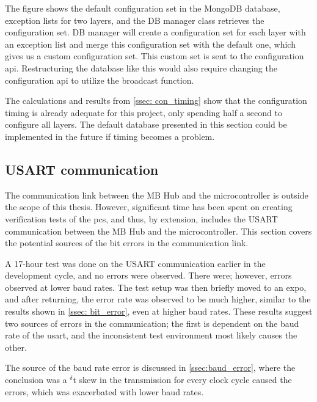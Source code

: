 \documentclass[main.tex]{subfiles}
\begin{document}
The figure shows the default configuration set in the MongoDB database, exception lists for two layers, and the DB manager class retrieves the configuration set. DB manager will create a configuration set for each layer with an exception list and merge this configuration set with the default one, which gives us a custom configuration set. This custom set is sent to the configuration \gls{api}. Restructuring the database like this would also require changing the configuration \gls{api} to utilize the broadcast function.

The calculations and results from \autoref{ssec: con_timing} show that the configuration timing is already adequate for this project, only spending half a second to configure all layers. The default database presented in this section could be implemented in the future if timing becomes a problem.


 
 
\subsection{USART communication}

The communication link between the MB Hub and the microcontroller is outside the scope of this thesis. However, significant time has been spent on creating verification tests of the \gls{pcs}, and thus, by extension, includes the USART communication between the MB Hub and the microcontroller. This section covers the potential sources of the bit errors in the communication link.

A 17-hour test was done on the USART communication earlier in the development cycle, and no errors were observed. There were; however, errors observed at lower baud rates. The test setup was then briefly moved to an expo, and after returning, the error rate was observed to be much higher, similar to the results shown in \autoref{ssec: bit_error}, even at higher baud rates. These results suggest two sources of errors in the communication; the first is dependent on the baud rate of the \gls{usart}, and the inconsistent test environment most likely causes the other. 

The source of the baud rate error is discussed in \autoref{ssec:baud_error}, where the conclusion was a $^\delta$t skew in the transmission for every clock cycle caused the errors, which was exacerbated with lower baud rates.
\end{document}
